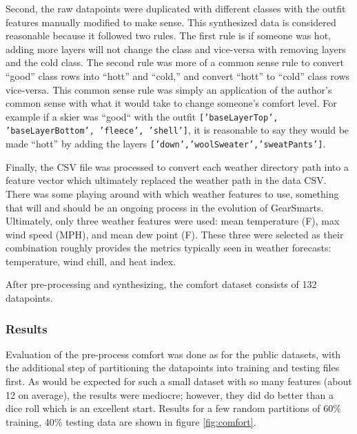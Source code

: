 Second, the raw datapoints were duplicated with different classes with the outfit features manually modified to make sense.
This synthesized data is considered reasonable because it followed two rules. The first rule is if someone was hot, adding
more layers will not change the class and vice-versa with removing layers and the cold class. The second rule was more of a
common sense rule to convert ``good'' class rows into ``hott'' and ``cold,'' and convert ``hott'' to ``cold'' class rows
vice-versa. This common sense rule was simply an application of the author's common sense with what it would take to
change someone's comfort level. For example if a skier was ``good`` with the outfit \texttt{['baseLayerTop', 'baseLayerBottom', 'fleece', 'shell']},
it is reasonable to say they would be made ``hott'' by adding the layers \texttt{['down','woolSweater','sweatPants']}.

Finally, the CSV file was processed to convert each weather directory path into a feature vector which ultimately replaced the
weather path in the data CSV. There was some playing around with which weather features to use, something that will and should
be an ongoing process in the evolution of GearSmarts. Ultimately, only three weather features were used: mean temperature (F),
max wind speed (MPH), and mean dew point (F). These three were selected as their combination roughly provides the metrics
typically seen in weather forecasts: temperature, wind chill, and heat index.

After pre-processing and synthesizing, the comfort dataset consists of 132 datapoints.

\subsubsection{Results}
\label{subsection:preprocessing}
Evaluation of the pre-process comfort was done as for the public datasets, with the additional step of partitioning the
datapoints into training and testing files first. As would be expected for such a small dataset with so many features
(about 12 on average), the results were mediocre; however, they did do better than a dice roll which is an excellent start.
Results for a few random partitions of 60\% training, 40\% testing data are shown in figure \ref{fig:comfort}.